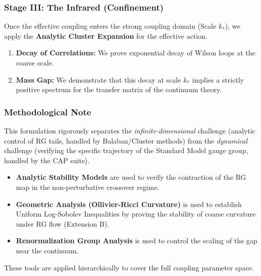 \subsubsection*{Stage III: The Infrared (Confinement)}
Once the effective coupling enters the strong coupling domain (Scale $k_*$), we apply the \textbf{Analytic Cluster Expansion} for the effective action.
\begin{enumerate}
    \item \textbf{Decay of Correlations:} We prove exponential decay of Wilson loops at the coarse scale.
    \item \textbf{Mass Gap:} We demonstrate that this decay at scale $k_*$ implies a strictly positive spectrum for the transfer matrix of the continuum theory.
\end{enumerate}

\subsubsection*{Methodological Note} %
This formulation rigorously separates the \emph{infinite-dimensional} challenge (analytic control of RG tails, handled by Balaban/Cluster methods) from the \emph{dynamical} challenge (verifying the specific trajectory of the Standard Model gauge group, handled by the CAP suite).
\begin{itemize}
    \item \textbf{Analytic Stability Models} are used to verify the contraction of the RG map in the non-perturbative crossover regime.
    \item \textbf{Geometric Analysis (Ollivier-Ricci Curvature)} is used to establish Uniform Log-Sobolev Inequalities by proving the stability of coarse curvature under RG flow (Extension B).
    \item \textbf{Renormalization Group Analysis} is used to control the scaling of the gap near the continuum.
\end{itemize}
These tools are applied hierarchically to cover the full coupling parameter space.






